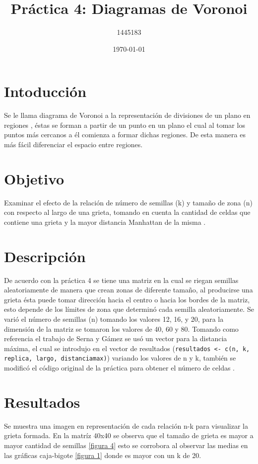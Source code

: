 \documentclass{article}
\author{1445183}
\title{Práctica 4: Diagramas de Voronoi}
\date{\today}
\begin{document}
\maketitle

\section{Intoducción}
Se le llama diagrama de Voronoi a la representación de divisiones de un plano en regiones \cite{voronoi}, éstas se forman a partir de un punto en un plano el cual al tomar los puntos más cercanos a él comienza a formar dichas regiones. De esta manera es más fácil diferenciar el espacio entre regiones.

\section{Objetivo}
Examinar el efecto de la relación de número de semillas (k) y tamaño de zona (n) con respecto al largo de una grieta, tomando en cuenta la cantidad de celdas que contiene una grieta y la mayor distancia Manhattan de la misma \cite{elisaweb4}.

\section{Descripción}
De acuerdo con la práctica 4 \cite{elisaweb4} se tiene una matriz en la cual se riegan semillas aleatoriamente de manera que crean zonas de diferente tamaño, al producirse una grieta ésta puede tomar dirección hacia el centro o hacia los bordes de la matriz, esto depende de los límites de zona que determinó cada semilla aleatoriamente. 
Se varió el número de semillas (n) tomando los valores 12, 16, y 20, para la dimensión de la matriz se tomaron los valores de 40, 60 y 80. Tomando como referencia el trabajo de Serna\cite{serna} y Gámez\cite{gamez} se usó un vector para la distancia máxima, el cual se introdujo en el vector de resultados (\texttt{resultados <- c(n, k, replica, largo, distanciamax)}) variando los valores de n y k, también se modificó el código original de la práctica para obtener el número de celdas \cite{dulce}. 

\section{Resultados}
Se muestra una imagen en representación de cada relación n-k para visualizar la grieta formada. En la matríz 40x40 se observa que el tamaño de grieta es mayor a mayor cantidad de semillas \ref{figura 4} esto se corrobora al observar las medias en las gráficas caja-bigote \ref{figura 1} donde es mayor con un k de 20.
 
\end{document}
